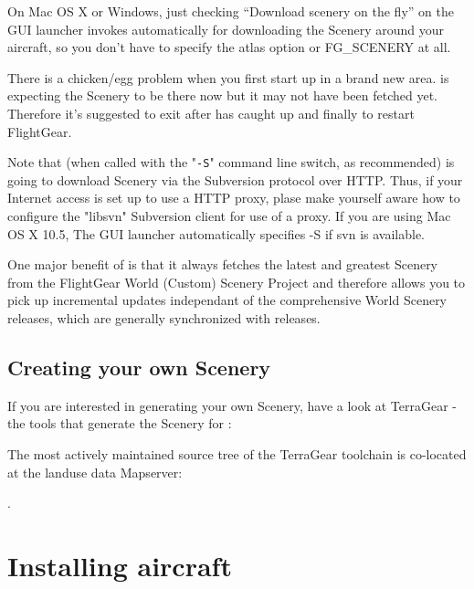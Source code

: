 On Mac OS X or Windows, just checking ``Download scenery on the fly'' on
the GUI launcher invokes \TerraSync{} automatically for downloading the Scenery
around your aircraft, so you don't have to specify the atlas option or 
FG\_SCENERY at all. 

There is a chicken/egg problem when you first start up in a brand new
area.  \FlightGear{} is expecting the Scenery to be there now but it may
not have been fetched yet. Therefore it's suggested to exit \FlightGear{}
after \TerraSync{} has caught up and finally to restart FlightGear.

Note that \TerraSync{} (when called with the "\texttt{-S}" command line
switch, as recommended) is going to download Scenery via the Subversion
protocol over HTTP. Thus, if your Internet access is set up to use a
HTTP proxy, plase make yourself aware how to configure the "libsvn"
Subversion client for use of a proxy. If you are using Mac OS X 10.5,
The GUI launcher automatically specifies -S if svn is available.
\medskip

One major benefit of \TerraSync{} is that it always fetches the latest and
greatest Scenery from the FlightGear World (Custom) Scenery Project and
therefore allows you to pick up incremental updates independant of the
comprehensive World Scenery releases, which are generally synchronized
with \FlightGear{} releases.

\subsection{Creating your own Scenery}

If you are interested in generating your own Scenery, have a look at TerraGear -
the tools that generate the Scenery for \FlightGear{}:

\medskip
{}
\medskip

The most actively maintained source tree of the TerraGear toolchain is
co-located at the \FlightGear{} landuse data Mapserver:

\medskip
{}.
\medskip

\section{Installing aircraft}\label{install_aircraft}

